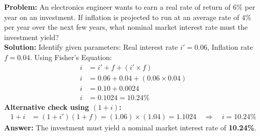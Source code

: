 \documentclass[12pt,a4paper]{article}
\begin{document}
\begin{tcolorbox}[examplebox, title={Example 1: Fisher's Equation}]
\textbf{Problem:} An electronics engineer wants to earn a real rate of return of $6\%$ per year on an investment. If inflation is projected to run at an average rate of $4\%$ per year over the next few years, what nominal market interest rate must the investment yield?\\[4pt]
\textbf{Solution:}
Identify given parameters: Real interest rate $i' = 0.06$, Inflation rate $f = 0.04$.
Using Fisher's Equation:
\begin{align*}
  i &= i' + f + (i' \times f) \\
  i &= 0.06 + 0.04 + (0.06 \times 0.04) \\
  i &= 0.10 + 0.0024 \\
  i &= 0.1024 = 10.24\%
\end{align*}
\textbf{Alternative check using $(1+i)$:}
\begin{align*}
  1 + i &= (1 + i')(1 + f) = (1.06) \times (1.04) = 1.1024 \quad \Rightarrow \quad i = 10.24\%
\end{align*}
\textbf{Answer:} The investment must yield a nominal market interest rate of \textbf{10.24\%}.
\end{tcolorbox}
\end{document}
